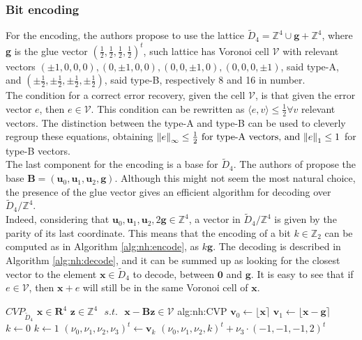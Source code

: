 \subsubsection{Bit encoding}
For the encoding, the authors propose to use the lattice $\tilde{D}_4 = \mathbb{Z}^4 \cup \mathbf{g} + \mathbb{Z}^4$, where \textbf{g} is the glue vector $(\frac{1}{2},\frac{1}{2},\frac{1}{2},\frac{1}{2})^t$, such lattice has Voronoi cell $\mathscr{V}$ with relevant vectors $(\pm1,0,0,0),(0,\pm1,0,0),(0,0,\pm1,0),(0,0,0,\pm1)$, said type-A, and $(\pm\frac{1}{2},\pm\frac{1}{2},\pm\frac{1}{2},\pm\frac{1}{2})$, said type-B, respectively 8 and 16 in number.\\
The condition for a correct error recovery, given the cell $\mathscr{V}$, is that given the error vector $e$, then $e\in\mathscr{V}$. This condition can be rewritten as $\langle e,v \rangle \leq \frac{1}{2} \forall v $ relevant vectors. The distinction between the type-A and type-B can be used to cleverly regroup these equations, obtaining $\norm{e \right\rVert_{\infty} \leq \frac{1}{2}$ for type-A vectors, and $\left\lVert e}_1 \leq 1$ for type-B vectors.\\
The last component for the encoding is a base for $\tilde{D}_4$. The authors of \cite{newhope} propose the base $\mathbf{B} = (\mathbf{u}_0,\mathbf{u}_1,\mathbf{u}_2,\mathbf{g})$. Although this might not seem the most natural choice, the presence of the glue vector gives an efficient algorithm for decoding over $\tilde{D}_4/\mathbb{Z}^4$.\\
Indeed, considering that $\mathbf{u}_0,\mathbf{u}_1,\mathbf{u}_2,2\mathbf{g} \in \mathbb{Z}^4$, a vector in $\tilde{D}_4/\mathbb{Z}^4$ is given by the parity of its last coordinate. This means that the encoding of a bit $k\in\mathbb{Z}_2$ can be computed as in Algorithm \ref{alg:nh:encode}, as $k\mathbf{g}$. The decoding is described in Algorithm \ref{alg:nh:decode}, and it can be summed up as looking for the closest vector to the element $\mathbf{x}\in\tilde{D}_4$ to decode, between $\mathbf{0}$ and $\mathbf{g}$. It is easy to see that if $e\in\mathscr{V}$, then $\mathbf{x} + e$ will still be in the same Voronoi cell of $\mathbf{x}$.

\begin{b_algorithm}{$CVP_{\tilde{D}_4}$}
{$\textbf{x} \in \mathbf{R}^4$}
{$\textbf{z} \in \mathbb{Z}^4\text{ }s.t.\text{ }\textbf{x} - \textbf{Bz} \in \mathscr{V}$}
{alg:nh:CVP}
\STATE $\textbf{v}_0 \gets \lfloor\textbf{x}\rceil$
\STATE $\textbf{v}_1 \gets \lfloor\textbf{x}-\textbf{g}\rceil$
    \STATE $k \gets 0$
\ELSE
    \STATE $k \gets 1$
\ENDIF
\STATE $(\nu_0,\nu_1,\nu_2,\nu_3)^t \gets \textbf{v}_k$
\RETURN $(\nu_0,\nu_1,\nu_2,k)^t + \nu_3\cdot(-1,-1,-1,2)^t$
\end{b_algorithm}

